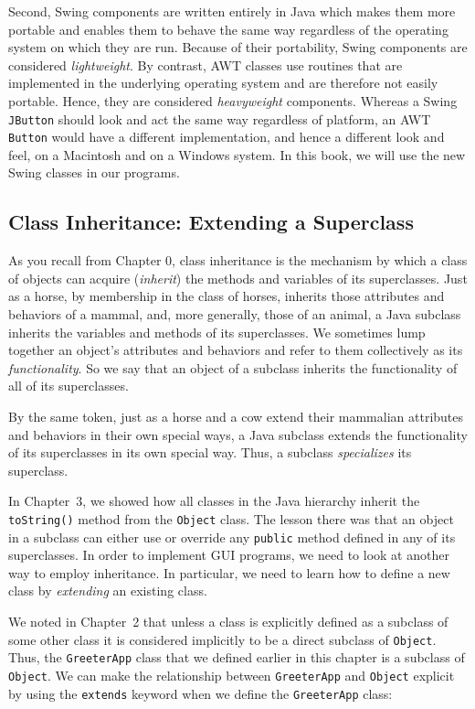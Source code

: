 Second, Swing components are written entirely in Java which makes them
more portable and enables them to behave the same way regardless of
the operating system on which they are run. Because of their
portability, Swing components are considered {\em lightweight}.  By
contrast, AWT classes use routines that are implemented in the
underlying operating system and are
therefore not easily portable. Hence, they are considered {\em
heavyweight} components.  Whereas a Swing {\tt JButton} should look
and act the same way regardless of platform, an AWT {\tt Button} would
have a different implementation, and hence a different look and feel,
on a Macintosh and on a Windows system.  In this book, we will use the
new Swing classes in our programs.

\subsection{Class Inheritance: Extending a Superclass}

As you recall from Chapter 0, class inheritance is the mechanism by
which a class of objects can 
acquire ({\em inherit}) the methods and variables of its superclasses.
Just as a horse, by membership in the class of horses, inherits those
attributes and behaviors of a mammal, and, more generally, those of an
animal, a Java subclass inherits the variables and methods of its
superclasses. We sometimes lump together an object's attributes and
 behaviors and refer to them collectively as
its {\em functionality}. So we say that an object of a subclass
inherits the functionality of all of its superclasses.

By the same token, just as a horse and a cow extend their mammalian
attributes and behaviors in their own special ways, a Java subclass
extends the functionality of its superclasses in its own special
way. Thus, a subclass {\em specializes} its superclass.

In Chapter~3, we showed how all classes in the Java
hierarchy inherit the {\tt toString()} method from the {\tt Object}
class.  The lesson there was that an object in a subclass can either
use or override any {\tt public} method defined in any of its
superclasses.  In order to implement GUI programs, we need to look at
another way to employ inheritance.  In particular, we need to learn
how to define a new class by {\it extending} an existing class.

We noted in Chapter~2 that unless a class is explicitly defined as a
subclass of some other class it is considered implicitly to be a
direct subclass of {\tt Object}.  Thus, the {\tt GreeterApp} class
that we defined earlier in this chapter is a subclass of {\tt
Object}. We can make the relationship between {\tt GreeterApp} and
{\tt Object} explicit by using the {\tt extends} keyword when we
define the {\tt GreeterApp} class:

